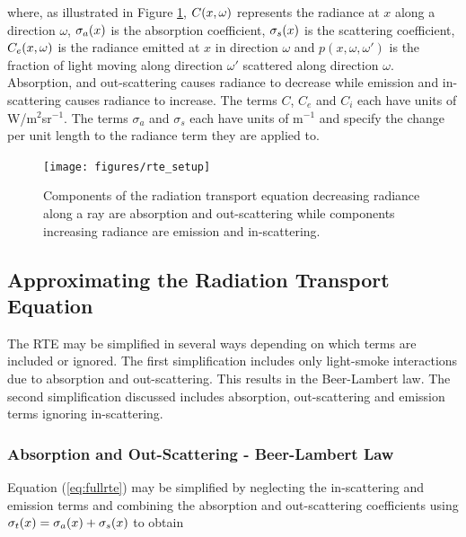 \noindent where, as illustrated in Figure \ref{figRadiance}, $C(x,\omega)$ represents the  radiance at $x$ along a direction $\omega$, $\sigma_a(x)$ is the absorption coefficient, $\sigma_s(x)$ is the scattering coefficient, $C_e(x,\omega)$ is the radiance emitted at $x$ in direction $\omega$ and $p(x,\omega,\omega')$ is the fraction of light moving along direction $\omega'$ scattered along direction $\omega$. Absorption, and out-scattering causes radiance to decrease while emission and in-scattering causes radiance to increase. The terms $C$, $C_e$ and $C_i$ each have units of W/m$^2$sr$^{-1}$.  The terms $\sigma_a$ and $\sigma_s$ each have units of m$^{-1}$ and specify the change per unit length to the radiance term they are applied to.

\begin{figure}[\figoptions]
\begin{center}
\texttt{[image: figures/rte\_setup]}
\end{center}
\caption{Components of the radiation transport equation decreasing radiance along a ray are
absorption and out-scattering while components increasing radiance are emission and in-scattering.}
\label{figRadiance}
\end{figure}

%
%

\subsection{Approximating the Radiation Transport Equation}

The RTE may be simplified in several ways depending on which terms are included or ignored.  The first simplification includes only light-smoke interactions due to absorption and out-scattering. This results in the Beer-Lambert law.  The second simplification discussed includes absorption, out-scattering and emission terms ignoring in-scattering.

%
%

\subsubsection{Absorption and Out-Scattering - Beer-Lambert Law}
Equation (\ref{eq:fullrte}) may be simplified by neglecting the in-scattering and emission terms and combining the absorption and out-scattering coefficients using $\sigma_t(x)=\sigma_a(x)+\sigma_s(x)$ to obtain

